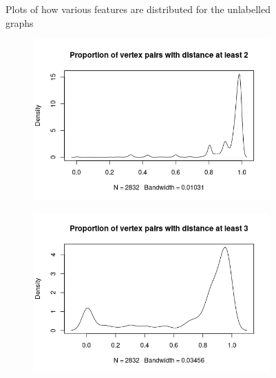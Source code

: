 \documentclass{l4proj}
\theoremstyle{definition}
\theoremstyle{remark}
\begin{document}
\begin{figure}
\begin{subfigure}[t]{0.49\textwidth}
  \end{subfigure}
  \caption{Plots of how various features are distributed for the unlabelled
    graphs}
  \label{fig:sip_features1}
\end{figure}

\begin{figure}
  \centering
  \begin{subfigure}[t]{0.49\textwidth}
    \centering
    \includegraphics[width=\textwidth]{images/sip_prop2.png}
  \end{subfigure}
  \begin{subfigure}[t]{0.49\textwidth}
    \centering
    \includegraphics[width=\textwidth]{images/sip_prop3.png}
  \end{subfigure}
  \begin{subfigure}[t]{0.49\textwidth}
    \centering

\end{subfigure}
\end{figure}
\end{document}
